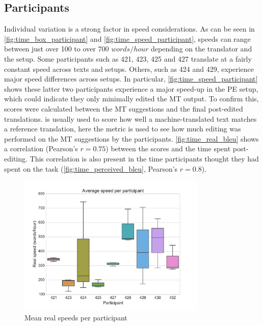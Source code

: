 \subsection{Participants}

\noindent Individual variation is a strong factor in speed considerations. As can be seen in \autoref{fig:time_box_participant} and \autoref{fig:time_speed_participant}, speeds can range between just over 100 to over 700 $words/hour$ depending on the translator and the setup. Some participants such as 421, 423, 425 and 427 translate at a fairly constant speed across texts and setups. Others, such as 424 and 429, experience major speed differences across setups. In particular, \autoref{fig:time_speed_participant} shows these latter two participants experience a major speed-up in the \ac{PE} setup, which could indicate they only minimally edited the \ac{MT} output. To confirm this,  \parencite{papineni2001bleu} scores were calculated between the \ac{MT} suggestions and the final post-edited translations.  is usually used to score how well a machine-translated text matches a reference translation, here the metric is used to see how much editing was performed on the \ac{MT} suggestions by the participants. \autoref{fig:time_real_bleu} shows a correlation (Pearson's $r = 0.75$) between the  scores and the time spent post-editing. This correlation is also present in the time participants thought they had spent on the task (\autoref{fig:time_perceived_bleu}, Pearson's $r = 0.8$).

\begin{figure}
    \myfloatalign
    \includegraphics[width=0.8\textwidth]{img/time/time_box_participant}
    \caption{Mean real speeds per participant}
    \label{fig:time_box_participant}
\end{figure}

